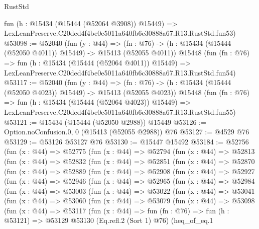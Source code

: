 \begin{lexlean}{RustStd}
\begin{coremodule}
    fun (h : @15434 (@15444 (@52064 @3908)) @15449) =>
    LexLeanPreserve.C20ded4f4be0e5011a640fb6c30888a67.R13.RustStd.fun53)
@53098 := @52040
    (fun (y : @44) =>
    (fn : @76) -> (h : @15434 (@15444 (@52050 @4011)) @15449) -> @15413 (@52055 @4011))
    @15448
    (fun (fn : @76) =>
    fun (h : @15434 (@15444 (@52064 @4011)) @15449) =>
    LexLeanPreserve.C20ded4f4be0e5011a640fb6c30888a67.R13.RustStd.fun54)
@53117 := @52040
    (fun (y : @44) =>
    (fn : @76) -> (h : @15434 (@15444 (@52050 @4023)) @15449) -> @15413 (@52055 @4023))
    @15448
    (fun (fn : @76) =>
    fun (h : @15434 (@15444 (@52064 @4023)) @15449) =>
    LexLeanPreserve.C20ded4f4be0e5011a640fb6c30888a67.R13.RustStd.fun55)
@53121 := @15434 (@15444 (@52050 @2988)) @15449
@53126 := Option.noConfusion.{0, 0} (@15413 (@52055 @2988)) @76
@53127 := @4529 @76
@53129 := @53126 @53127 @76
@53130 := @15447 @15492
@53184 := @52756
    (fun (x : @44) =>
    @52775
      (fun (x : @44) =>
      @52794
        (fun (x : @44) =>
        @52813
          (fun (x : @44) =>
          @52832
            (fun (x : @44) =>
            @52851
              (fun (x : @44) =>
              @52870
                (fun (x : @44) =>
                @52889
                  (fun (x : @44) =>
                  @52908
                    (fun (x : @44) =>
                    @52927
                      (fun (x : @44) =>
                      @52946
                        (fun (x : @44) =>
                        @52965
                          (fun (x : @44) =>
                          @52984
                            (fun (x : @44) =>
                            @53003
                              (fun (x : @44) =>
                              @53022
                                (fun (x : @44) =>
                                @53041
                                  (fun (x : @44) =>
                                  @53060
                                    (fun (x : @44) =>
                                    @53079
                                      (fun (x : @44) =>
                                      @53098
                                        (fun (x : @44) =>
                                        @53117
                                          (fun (x : @44) =>
                                          fun (fn : @76) =>
                                          fun (h : @53121) =>
                                          @53129
                                            @53130
                                            (Eq.refl.{2} (Sort 1) @76)
                                            (heq_of_eq.{1}

\end{coremodule}
\end{lexlean}
